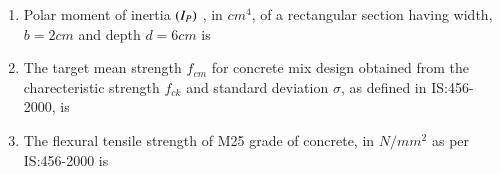 \documentclass[journal,12pt,onecolumn]{IEEEtran}
\theoremstyle{remark}
\begin{document}
\begin{enumerate}
    \item Polar moment of inertia $\left(I_{P}\right)$ , in $cm^{4}$, of a rectangular section having width, $ b = 2 cm $ and depth $ d = 6 cm $  is \underline{\hspace{2cm}} 
    \item The target mean strength $f_{cm}$ for concrete mix design obtained from the charecteristic strength $f_{ck}$  and standard deviation $\sigma$, as defined in IS:456-2000, is
    \begin{enumerate}
    \end{enumerate}

\item The flexural tensile strength of M25 grade of concrete, in $N/mm^{2}$ as per IS:456-2000 is \underline{\hspace {1 cm}}


\end{enumerate}
\end{document}
